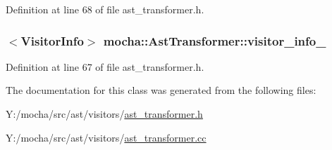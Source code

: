 Definition at line 68 of file ast\_\-transformer.h.

\hypertarget{classmocha_1_1_ast_transformer_ac28baaac681c02d0ac103196409bd1f9}{
\subsubsection[{visitor\_\-info\_\-}]{$<${\bf VisitorInfo}$>$ {\bf mocha::AstTransformer::visitor\_\-info\_\-}}}
\label{classmocha_1_1_ast_transformer_ac28baaac681c02d0ac103196409bd1f9}


Definition at line 67 of file ast\_\-transformer.h.



The documentation for this class was generated from the following files:\begin{DoxyCompactItemize}
\item 
Y:/mocha/src/ast/visitors/\hyperlink{ast__transformer_8h}{ast\_\-transformer.h}\item 
Y:/mocha/src/ast/visitors/\hyperlink{ast__transformer_8cc}{ast\_\-transformer.cc}\end{DoxyCompactItemize}
